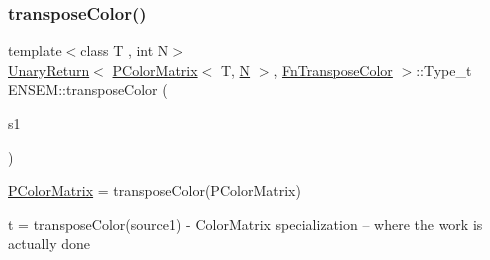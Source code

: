 \subsubsection{\texorpdfstring{transposeColor()}{transposeColor()}}
{\footnotesize\ttfamily template$<$class T , int N$>$ \\
\mbox{\hyperlink{structENSEM_1_1UnaryReturn}{Unary\+Return}}$<$ \mbox{\hyperlink{classENSEM_1_1PColorMatrix}{P\+Color\+Matrix}}$<$ T, \mbox{\hyperlink{adat__devel_2lib_2hadron_2operator__name__util_8cc_a7722c8ecbb62d99aee7ce68b1752f337}{N}} $>$, \mbox{\hyperlink{structENSEM_1_1FnTransposeColor}{Fn\+Transpose\+Color}} $>$\+::Type\+\_\+t E\+N\+S\+E\+M\+::transpose\+Color (\begin{DoxyParamCaption}\item[{const \mbox{\hyperlink{classENSEM_1_1PColorMatrix}{P\+Color\+Matrix}}$<$ T, \mbox{\hyperlink{adat__devel_2lib_2hadron_2operator__name__util_8cc_a7722c8ecbb62d99aee7ce68b1752f337}{N}} $>$ \&}]{s1 }\end{DoxyParamCaption})\hspace{0.3cm}{\ttfamily [inline]}}



\mbox{\hyperlink{classENSEM_1_1PColorMatrix}{P\+Color\+Matrix}} = transpose\+Color(\+P\+Color\+Matrix) 

t = transpose\+Color(source1) -\/ Color\+Matrix specialization -- where the work is actually done 